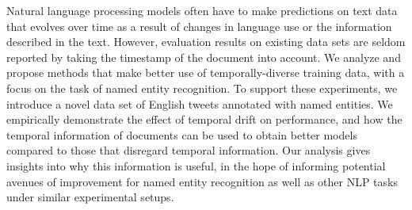 Natural language processing models often have to make predictions on text data that evolves over time as a result of changes in language use or the information described in the text. However, evaluation results on existing data sets are seldom reported by taking the timestamp of the document into account. We analyze and propose methods that make better use of temporally-diverse training data, with a focus on the task of named entity recognition. To support these experiments, we introduce a novel data set of English tweets annotated with named entities. We empirically demonstrate the effect of temporal drift on performance, and how the temporal information of documents can be used to obtain better models compared to those that disregard temporal information. Our analysis gives insights into why this information is useful, in the hope of informing potential avenues of improvement for named entity recognition as well as other NLP tasks under similar experimental setups.
